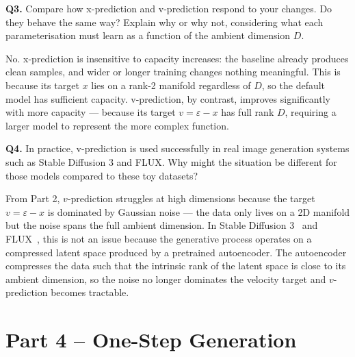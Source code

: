 \documentclass[11pt, a4paper]{article}
\begin{document}
\textbf{Q3.}
Compare how x-prediction and v-prediction respond to your changes.  Do they
behave the same way?  Explain why or why not, considering what each
parameterisation must learn as a function of the ambient dimension $D$.

No. x-prediction is insensitive to capacity increases: the baseline already produces clean samples,
and wider or longer training changes nothing meaningful. This is because its target $x$ lies on a
rank-2 manifold regardless of $D$, so the default model has sufficient capacity.
v-prediction, by contrast, improves significantly with more capacity — because its target
$v = \varepsilon - x$ has full rank $D$, requiring a larger model to represent the more complex function.


\textbf{Q4.}
In practice, v-prediction is used successfully in real image generation systems
such as Stable Diffusion 3 and FLUX.  Why might the situation be different for
those models compared to these toy datasets?

From Part 2, $v$-prediction struggles at high dimensions because the target
$v = \varepsilon - x$ is dominated by Gaussian noise — the data only lives
on a 2D manifold but the noise spans the full ambient dimension. In
Stable Diffusion 3~\cite{esser2024sd3} and FLUX~\cite{flux2025kontext}, this is not an
issue because the generative process operates on a compressed latent
space produced by a pretrained autoencoder.
The autoencoder compresses the data such that the intrinsic rank of the
latent space is close to its ambient dimension, so the noise no
longer dominates the velocity target and $v$-prediction becomes tractable.

\newpage
\section{Part 4 – One-Step Generation}
\end{document}
